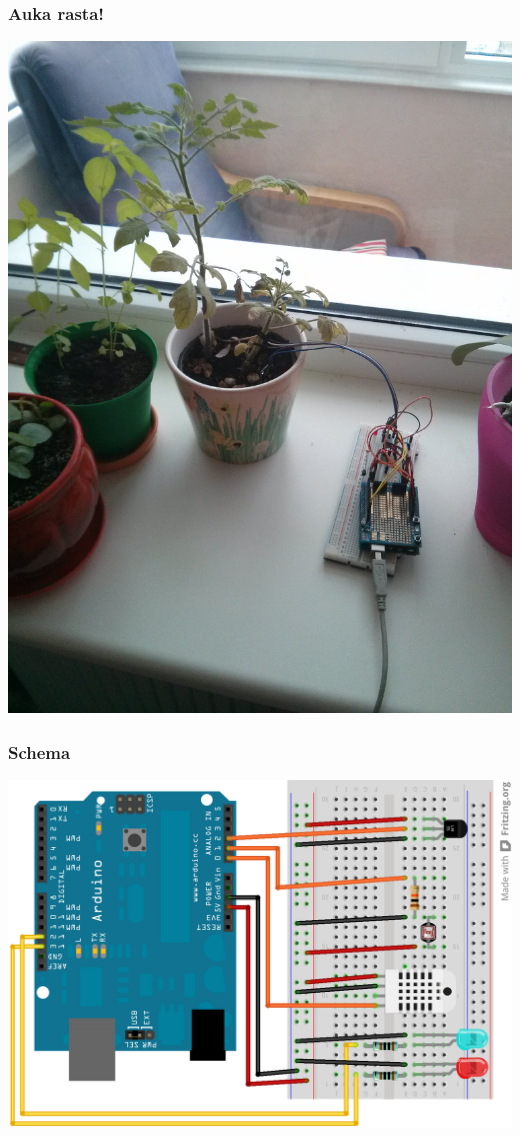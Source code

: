 \documentclass[12pt,a4paper]{beamer}
\begin{document}
\begin{frame}
    \frametitle{Auka rasta!}
    \begin{center}
        \includegraphics[scale=0.2]{img/pomidoras.jpg}
    \end{center}
\end{frame}

\begin{frame}
    \frametitle{Schema}
    \begin{center}
        \includegraphics[scale=0.2]{img/schema.png}
    \end{center}
\end{frame}
\end{document}
